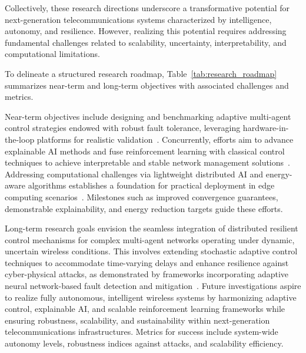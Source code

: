 \documentclass[sigconf]{acmart}
\begin{document}
Collectively, these research directions underscore a transformative potential for next-generation telecommunications systems characterized by intelligence, autonomy, and resilience. However, realizing this potential requires addressing fundamental challenges related to scalability, uncertainty, interpretability, and computational limitations.

To delineate a structured research roadmap, Table~\ref{tab:research_roadmap} summarizes near-term and long-term objectives with associated challenges and metrics.

Near-term objectives include designing and benchmarking adaptive multi-agent control strategies endowed with robust fault tolerance, leveraging hardware-in-the-loop platforms for realistic validation~\cite{ref46}. Concurrently, efforts aim to advance explainable AI methods and fuse reinforcement learning with classical control techniques to achieve interpretable and stable network management solutions~\cite{ref50}. Addressing computational challenges via lightweight distributed AI and energy-aware algorithms establishes a foundation for practical deployment in edge computing scenarios~\cite{ref49}. Milestones such as improved convergence guarantees, demonstrable explainability, and energy reduction targets guide these efforts.

Long-term research goals envision the seamless integration of distributed resilient control mechanisms for complex multi-agent networks operating under dynamic, uncertain wireless conditions. This involves extending stochastic adaptive control techniques to accommodate time-varying delays and enhance resilience against cyber-physical attacks, as demonstrated by frameworks incorporating adaptive neural network-based fault detection and mitigation~\cite{ref46}. Future investigations aspire to realize fully autonomous, intelligent wireless systems by harmonizing adaptive control, explainable AI, and scalable reinforcement learning frameworks while ensuring robustness, scalability, and sustainability within next-generation telecommunications infrastructures. Metrics for success include system-wide autonomy levels, robustness indices against attacks, and scalability efficiency.
\end{document}
